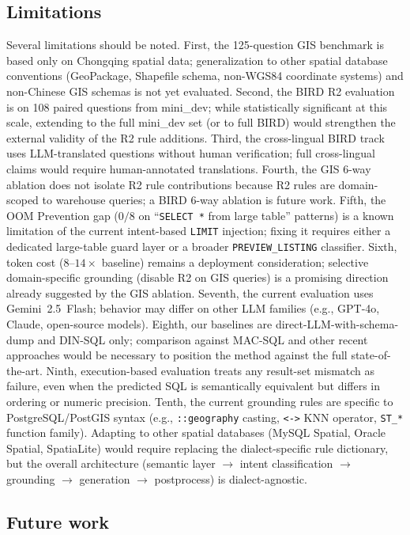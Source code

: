 \documentclass[11pt]{article}
\begin{document}
\subsection{Limitations}

Several limitations should be noted. First, the 125-question GIS benchmark is based only on Chongqing spatial data; generalization to other spatial database conventions (GeoPackage, Shapefile schema, non-WGS84 coordinate systems) and non-Chinese GIS schemas is not yet evaluated. Second, the BIRD R2 evaluation is on 108 paired questions from mini\_dev; while statistically significant at this scale, extending to the full mini\_dev set (or to full BIRD) would strengthen the external validity of the R2 rule additions. Third, the cross-lingual BIRD track uses LLM-translated questions without human verification; full cross-lingual claims would require human-annotated translations. Fourth, the GIS 6-way ablation does not isolate R2 rule contributions because R2 rules are domain-scoped to warehouse queries; a BIRD 6-way ablation is future work. Fifth, the OOM Prevention gap ($0/8$ on ``\texttt{SELECT *} from large table'' patterns) is a known limitation of the current intent-based \texttt{LIMIT} injection; fixing it requires either a dedicated large-table guard layer or a broader \texttt{PREVIEW\_LISTING} classifier. Sixth, token cost ($8$--$14\times$ baseline) remains a deployment consideration; selective domain-specific grounding (disable R2 on GIS queries) is a promising direction already suggested by the GIS ablation. Seventh, the current evaluation uses Gemini~2.5~Flash; behavior may differ on other LLM families (e.g., GPT-4o, Claude, open-source models). Eighth, our baselines are direct-LLM-with-schema-dump and DIN-SQL only; comparison against MAC-SQL and other recent approaches would be necessary to position the method against the full state-of-the-art. Ninth, execution-based evaluation treats any result-set mismatch as failure, even when the predicted SQL is semantically equivalent but differs in ordering or numeric precision. Tenth, the current grounding rules are specific to PostgreSQL/PostGIS syntax (e.g., \texttt{::geography} casting, \texttt{<->} KNN operator, \texttt{ST\_*} function family). Adapting to other spatial databases (MySQL Spatial, Oracle Spatial, SpatiaLite) would require replacing the dialect-specific rule dictionary, but the overall architecture (semantic layer $\to$ intent classification $\to$ grounding $\to$ generation $\to$ postprocess) is dialect-agnostic.

\subsection{Future work}
\end{document}
